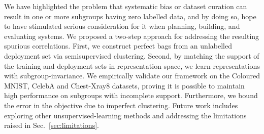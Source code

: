 We have highlighted the problem that systematic bias or dataset curation can result in one or more
subgroups having zero labelled data, and by doing so, hope to have stimulated serious consideration
for it when planning, building, and evaluating %
systems.
%
We proposed a two-step approach for addressing the resulting spurious correlations.
%
First, we construct perfect bags from an unlabelled deployment set via semisupervised clustering. 
%
Second, by matching the support of the training and deployment sets in representation space, we
learn representations with subgroup-invariance.
%
We empirically validate our frame\-work on the Coloured MNIST, CelebA and Chest-Xray8 datasets,
proving it is possible to maintain high performance on subgroups with incomplete support.
%
Furthermore, we bound the error in the objective due to imperfect clustering.
%
Future work includes exploring other unsupervised-learning methods and addressing the limitations
raised in Sec.~\ref{sec:limitations}.

